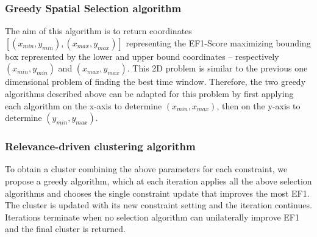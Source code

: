 

\subsubsection{Greedy Spatial Selection algorithm}

The aim of this algorithm is to return coordinates $[(x_{min},y_{min}),(x_{max},y_{max})]$ representing the EF1-Score maximizing bounding box represented by the lower and upper bound coordinates -- respectively $(x_{min},y_{min})$ and $(x_{max},y_{max})$. This 2D problem is similar to the previous one dimensional problem of finding the best time window. Therefore, the two greedy algorithms described above can be adapted for this problem by first applying each algorithm on the x-axis to determine $(x_{min},x_{max})$, then on the y-axis to determine $(y_{min},y_{max})$. 


\subsubsection{Relevance-driven clustering algorithm} To obtain a cluster combining the above parameters for each constraint, we propose a greedy algorithm, which at each iteration applies all the above selection algorithms and chooses the single constraint update that improves the most EF1.  The cluster is updated with its new constraint setting and the iteration continues.  Iterations terminate when no selection algorithm can unilaterally improve EF1 and the final cluster is returned.

